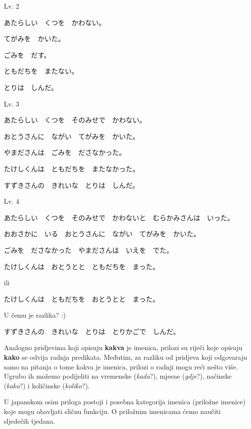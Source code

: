 	\begin{mondai}{Lv. 2}
		\item あたらしい　くつを　かわない。
		\item てがみを　かいた。
		\item ごみを　だす。
		\item ともだちを　またない。
		\item とりは　しんだ。
	\end{mondai}

	\begin{mondai}{Lv. 3}
		\item あたらしい　くつを　そのみせで　かわない。
		\item おとうさんに　ながい　てがみを　かいた。
		\item やまださんは　ごみを　ださなかった。
		\item たけしくんは　ともだちを　またなかった。
		\item すずきさんの　きれいな　とりは　しんだ。
	\end{mondai}

	\begin{mondai}{Lv. 4}
		\item あたらしい　くつを　そのみせで　かわないと　むらかみさんは　いった。
		\item *おおさかに　いる　おとうさんに　ながい　てがみを　かいた。
		\item *ごみを　ださなかった　やまださんは　いえを　でた。
		\item たけしくんは　おとうとと　ともだちを　まった。
		
		ili
		
		たけしくんは　ともだちを　おとうとと　まった。
		
		U čemu je razlika? :)
		\item すずきさんの　きれいな　とりは　とりかごで　しんだ。
	\end{mondai}
\newpage
{}

	
	Analogno pridjevima koji opisuju \textbf{kakva} je imenica, prilozi su riječi koje opisuju \textbf{kako} se odvija radnja predikata. Međutim, za razliku od pridjeva koji odgovaraju samo na pitanja o tome kakva je imenica, prilozi o radnji mogu reći nešto više. Ugrubo ih možemo podijeliti na vremenske (\textit{kada}?), mjesne (\textit{gdje}?), načinske (\textit{kako}?) i količinske (\textit{koliko}?).
	
	U japanskom osim priloga postoji i posebna kategorija imenica (priložne imenice) koje mogu obavljati sličnu funkciju. O priložnim imenicama ćemo naučiti sljedećih tjedana.
	
